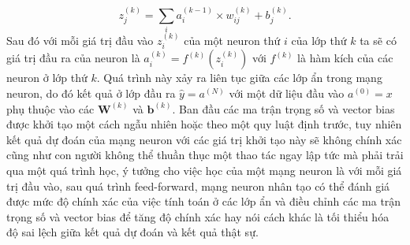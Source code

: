 \begin{equation}
	z^{(k)}_j={\sum_i} {a^{(k-1)}_i} \times {w^{(k)}_{ij}} + {{b}^{(k)}_j}.
\end{equation}
Sau đó với mỗi giá trị đầu vào $z^{(k)}_i$ của một neuron thứ $i$ của lớp thứ $k$ ta sẽ có giá trị đầu ra của neuron là $a^{(k)}_i=f^{(k)}\left(z^{(k)}_i\right)$ với $f^{(k)}$ là hàm kích của các neuron ở lớp thứ $k$. Quá trình này xảy ra liên tục giữa các lớp ẩn trong mạng neuron, do đó kết quả ở lớp đầu ra $\widehat{y}=a^{(N)}$ với một dữ liệu đầu vào $a^{(0)}=x$ phụ thuộc vào các $\boldsymbol{W}^{(k)}$ và $\boldsymbol{b}^{(k)}$. Ban đầu các ma trận trọng số và vector bias được khởi tạo một cách ngẫu nhiên hoặc theo một quy luật định trước, tuy nhiên kết quả dự đoán của mạng neuron với các giá trị khởi tạo này sẽ không chính xác cũng như con người không thể thuần thục một thao tác ngay lập tức mà phải trải qua một quá trình học, ý tưởng cho việc học của một mạng neuron là với mỗi giá trị đầu vào, sau quá trình feed-forward, mạng neuron nhân tạo có thể đánh giá được mức độ chính xác của việc tính toán ở các lớp ẩn và điều chỉnh các ma trận trọng số và vector bias để tăng độ chính xác hay nói cách khác là tối thiểu hóa độ sai lệch giữa kết quả dự đoán và kết quả thật sự.
